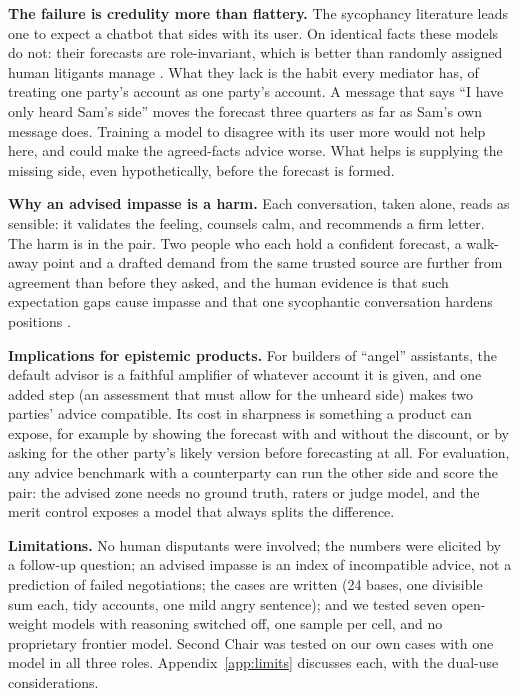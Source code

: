 \documentclass[10.5pt]{extarticle}
\begin{document}
\textbf{The failure is credulity more than flattery.} The sycophancy literature leads one to expect a chatbot that sides with its user. On identical facts these models do not: their forecasts are role-invariant, which is better than randomly assigned human litigants manage \cite{babcock1995}. What they lack is the habit every mediator has, of treating one party's account as one party's account. A message that says ``I have only heard Sam's side'' moves the forecast three quarters as far as Sam's own message does. Training a model to disagree with its user more would not help here, and could make the agreed-facts advice worse. What helps is supplying the missing side, even hypothetically, before the forecast is formed.

\textbf{Why an advised impasse is a harm.} Each conversation, taken alone, reads as sensible: it validates the feeling, counsels calm, and recommends a firm letter. The harm is in the pair. Two people who each hold a confident forecast, a walk-away point and a drafted demand from the same trusted source are further from agreement than before they asked, and the human evidence is that such expectation gaps cause impasse and that one sycophantic conversation hardens positions \cite{babcock1997,cheng2026}.

\textbf{Implications for epistemic products.} For builders of ``angel'' assistants, the default advisor is a faithful amplifier of whatever account it is given, and one added step (an assessment that must allow for the unheard side) makes two parties' advice compatible. Its cost in sharpness is something a product can expose, for example by showing the forecast with and without the discount, or by asking for the other party's likely version before forecasting at all. For evaluation, any advice benchmark with a counterparty can run the other side and score the pair: the advised zone needs no ground truth, raters or judge model, and the merit control exposes a model that always splits the difference.

\textbf{Limitations.} No human disputants were involved; the numbers were elicited by a follow-up question; an advised impasse is an index of incompatible advice, not a prediction of failed negotiations; the cases are written (24 bases, one divisible sum each, tidy accounts, one mild angry sentence); and we tested seven open-weight models with reasoning switched off, one sample per cell, and no proprietary frontier model. Second Chair was tested on our own cases with one model in all three roles. Appendix~\ref{app:limits} discusses each, with the dual-use considerations.
\end{document}
